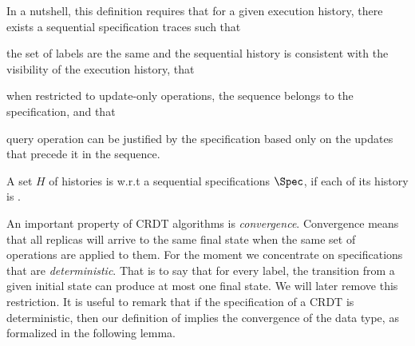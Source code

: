 In a nutshell, this definition requires that for a given execution
history, there exists a sequential specification traces such
that
\begin{inparaenum}
\item the set of labels are the same and the sequential history is
  consistent with the visibility of the execution history, that
\item when restricted to update-only operations, the sequence belongs to
  the specification, and that
\item query operation can be justified by the specification based only
  on the updates that precede it in the sequence.
\end{inparaenum}


A set $H$ of histories is \crdtlinearizable{} w.r.t
a sequential specifications $\Spec$, if each of its history is
\crdtlinearizable{}.
%

An important property of CRDT algorithms is \emph{convergence}.
Convergence means that all replicas will arrive to the same final
state when the same set of operations are applied to them.
For the moment we concentrate on specifications that are
\emph{deterministic}.
That is to say that for every label, the transition from a given
initial state can produce at most one final state.
We will later remove this restriction.
It is useful to remark that if the specification of a CRDT is
deterministic, then our definition of \crdtlin{} implies the
convergence of the data type, as formalized in the following lemma.





